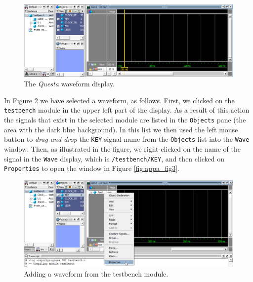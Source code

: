 \documentclass[11pt, twoside, pdftex]{article}
\begin{document}
\begin{figure}[h]
	\begin{center}
		\includegraphics[width = \textwidth]{figures/appa_fig1.png}
	\end{center}
		  \caption{The {\it Questa} waveform display.}
	\label{fig:appa_fig1}
\end{figure}

\noindent
In Figure \ref{fig:appa_fig2} we have selected a waveform, as follows. First, we clicked
on the \texttt{testbench} module in the upper left part of the display. As a result of
this action the signals that exist in the selected module are listed in the \texttt{Objects}
pane (the area with the dark blue background). In this list we then used the 
left mouse button to {\it drag-and-drop} the \texttt{KEY} signal name from the 
\texttt{Objects} list into the \texttt{Wave} window. Then, as illustrated in the figure, we 
right-clicked on the name of the signal in the \texttt{Wave} display, which is 
\texttt{/testbench/KEY}, and then clicked on \texttt{Properties} to open the window in 
Figure \ref{fig:appa_fig3}.

\begin{figure}[h]
	\begin{center}
		\includegraphics[width = \textwidth]{figures/appa_fig2.png}
	\end{center}
		  \caption{Adding a waveform from the testbench module.}
	\label{fig:appa_fig2}
\end{figure}
\end{document}
